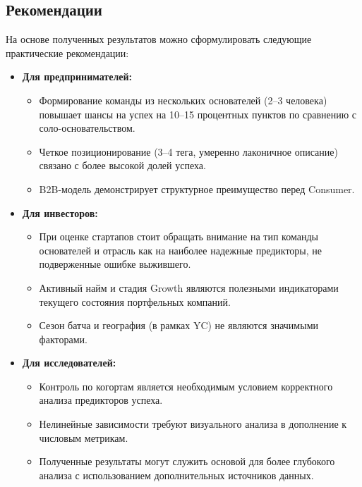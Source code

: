 \subsection{Рекомендации}

На основе полученных результатов можно сформулировать следующие практические рекомендации:

\begin{itemize}
    \item \textbf{Для предпринимателей:}
    \begin{itemize}
        \item Формирование команды из нескольких основателей (2--3 человека) повышает шансы на успех на 10--15 процентных пунктов по сравнению с соло-основательством.
        \item Четкое позиционирование (3--4 тега, умеренно лаконичное описание) связано с более высокой долей успеха.
        \item B2B-модель демонстрирует структурное преимущество перед Consumer.
    \end{itemize}
    \item \textbf{Для инвесторов:}
    \begin{itemize}
        \item При оценке стартапов стоит обращать внимание на тип команды основателей и отрасль как на наиболее надежные предикторы, не подверженные ошибке выжившего.
        \item Активный найм и стадия Growth являются полезными индикаторами текущего состояния портфельных компаний.
        \item Сезон батча и география (в рамках YC) не являются значимыми факторами.
    \end{itemize}
    \item \textbf{Для исследователей:}
    \begin{itemize}
        \item Контроль по когортам является необходимым условием корректного анализа предикторов успеха.
        \item Нелинейные зависимости требуют визуального анализа в дополнение к числовым метрикам.
        \item Полученные результаты могут служить основой для более глубокого анализа с использованием дополнительных источников данных.
    \end{itemize}
\end{itemize}
